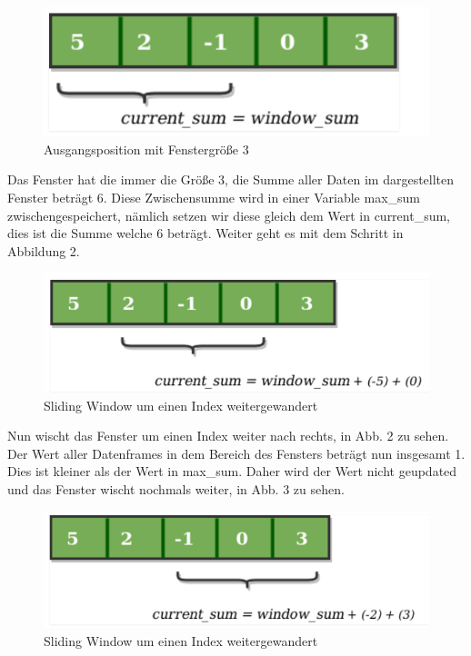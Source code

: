\documentclass{article}
\begin{document}
\begin{center}
\begin{figure}[h]
    \centering
    \includegraphics[width=\textwidth]{slidingwindow1.png}
    \caption{Ausgangsposition mit Fenstergröße 3}
\end{figure}
\end{center}
\break

Das Fenster hat die immer die Größe 3, die Summe aller Daten im dargestellten Fenster beträgt 6. Diese Zwischensumme wird in einer Variable max\_sum zwischengespeichert, nämlich setzen wir diese gleich dem Wert in current\_sum, dies ist die Summe welche 6 beträgt. Weiter geht es mit dem Schritt in Abbildung 2.

\begin{center}
\begin{figure}[h]
    \centering
    \includegraphics[width=\textwidth]{slidingwindow2.png}
    \caption{Sliding Window um einen Index weitergewandert}
\end{figure}
\end{center}

Nun wischt das Fenster um einen Index weiter nach rechts, in Abb. 2 zu sehen. Der Wert aller Datenframes in dem Bereich des Fensters beträgt nun insgesamt 1. Dies ist kleiner als der Wert in max\_sum. Daher wird der Wert nicht geupdated und das Fenster wischt nochmals weiter, in Abb. 3 zu sehen.

\begin{center}
\begin{figure}[h]
    \centering
    \includegraphics[width=\textwidth]{slidingwindow3.png}
    \caption{Sliding Window um einen Index weitergewandert}
\end{figure}
\end{center}
\break
\end{document}
